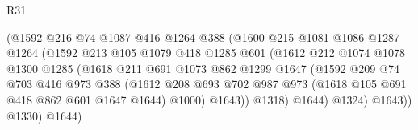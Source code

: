 \begin{lexlean}{R31}
\begin{coremodule}
                                  (@1592
                                    @216
                                    @74
                                    @1087
                                    @416
                                    @1264
                                    @388
                                    (@1600
                                      @215
                                      @1081
                                      @1086
                                      @1287
                                      @1264
                                      (@1592
                                        @213
                                        @105
                                        @1079
                                        @418
                                        @1285
                                        @601
                                        (@1612
                                          @212
                                          @1074
                                          @1078
                                          @1300
                                          @1285
                                          (@1618
                                            @211
                                            @691
                                            @1073
                                            @862
                                            @1299
                                            @1647
                                            (@1592
                                              @209
                                              @74
                                              @703
                                              @416
                                              @973
                                              @388
                                              (@1612
                                                @208
                                                @693
                                                @702
                                                @987
                                                @973
                                                (@1618 @105 @691 @418 @862 @601 @1647 @1644)
                                                @1000)
                                              @1643))
                                          @1318)
                                        @1644)
                                      @1324)
                                    @1643))
                                @1330)
                              @1644)

\end{coremodule}
\end{lexlean}
